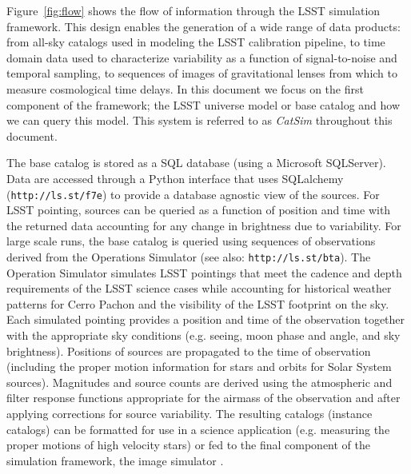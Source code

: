 \documentclass[11pt]{article}
\begin{document}
Figure~\ref{fig:flow} shows the flow of information through the LSST
simulation framework.
This design enables the generation of a wide range of data products:
from all-sky catalogs used in modeling the LSST calibration pipeline,
to time domain data used to characterize variability as a function of
signal-to-noise and temporal sampling, to sequences of images of
gravitational lenses from which to measure cosmological time delays.
In this document we focus on the first component of the framework; the
LSST universe model or base catalog and how we can query this
model. This system is referred to as {\it CatSim} throughout this
document.

The base catalog is stored as a SQL database (using a Microsoft
SQLServer). Data are accessed through a Python interface that uses
SQLalchemy ({\tt http://ls.st/f7e}) to provide a database
agnostic view of the sources. For LSST pointing, sources can be
queried as a function of position and time with the returned data
accounting for any change in brightness due to variability. For large
scale runs, the base catalog is queried using sequences of
observations derived from the Operations Simulator \citep{cook09} (see
also: {\tt http://ls.st/bta}).  The Operation Simulator
simulates LSST pointings that meet the cadence and depth requirements
of the LSST science cases while accounting for historical weather
patterns for Cerro Pachon and the visibility of the LSST footprint on
the sky. Each simulated pointing provides a position and time of the
observation together with the appropriate sky conditions (e.g. seeing,
moon phase and angle, and sky brightness). Positions of sources are
propagated to the time of observation (including the proper motion
information for stars and orbits for Solar System sources). Magnitudes
and source counts are derived using the atmospheric and filter
response functions appropriate for the airmass of the observation and
after applying corrections for source variability. The resulting
catalogs (instance catalogs) can be formatted for use in a science
application (e.g. measuring the proper motions of high velocity stars)
or fed to the final component of the simulation framework, the image
simulator \citep{phosim}.
\end{document}
